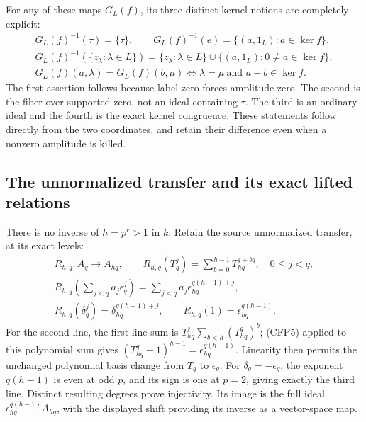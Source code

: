 For any of these maps $G_L(f)$, its three distinct
kernel notions are completely explicit:
\begin{equation}\tag{CFP10}
\begin{gathered}
 G_L(f)^{-1}(\tau)=\{\tau\},\qquad
 G_L(f)^{-1}(e)=\{(a,1_L):a\in\ker f\},\\
 G_L(f)^{-1}(\{z_\lambda:\lambda\in L\})
   =\{z_\lambda:\lambda\in L\}
                  \cup\{(a,1_L):0\ne a\in\ker f\},\\
 G_L(f)(a,\lambda)=G_L(f)(b,\mu)
        \Longleftrightarrow\lambda=\mu\ \text{and }a-b\in\ker f.
\end{gathered}
\end{equation}
The first assertion follows because label zero
forces amplitude zero. The second is the fiber over
supported zero, not an ideal containing $\tau$.
The third is an ordinary ideal and the fourth is
the exact kernel congruence. These statements follow
directly from the two coordinates, and retain their
difference even when a nonzero amplitude is killed.

\subsection{The unnormalized transfer and its exact lifted relations}

There is no inverse of $h=p^r>1$ in $k$. Retain the
source unnormalized transfer, at its exact levels:
\begin{equation}\tag{CFP11}
\begin{gathered}
 R_{h,q}:A_q\longrightarrow A_{hq},\qquad
 R_{h,q}(T_q^j)=\sum_{b=0}^{h-1}T_{hq}^{j+bq},\quad 0\le j<q,\\
 R_{h,q}(\sum_{j<q}a_j\epsilon_q^j)
           =\sum_{j<q}a_j\epsilon_{hq}^{q(h-1)+j},\\
 R_{h,q}(\delta_q^j)=\delta_{hq}^{q(h-1)+j},\qquad
 R_{h,q}(1)=\epsilon_{hq}^{q(h-1)}.
\end{gathered}
\end{equation}
For the second line, the first-line sum is
$T_{hq}^j\sum_{b<h}(T_{hq}^q)^b$; (CFP5) applied
to this polynomial sum gives
$(T_{hq}^q-1)^{h-1}=\epsilon_{hq}^{q(h-1)}$.
Linearity then permits the unchanged polynomial
basis change from $T_q$ to $\epsilon_q$.
For $\delta_q=-\epsilon_q$, the exponent
$q(h-1)$ is even at odd $p$, and its sign is one
at $p=2$, giving exactly the third line.
Distinct resulting degrees prove injectivity.
Its image is the full ideal
$\epsilon_{hq}^{q(h-1)}A_{hq}$, with the displayed
shift providing its inverse as a vector-space map.


